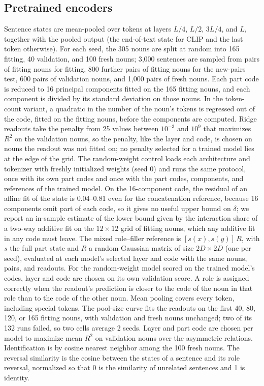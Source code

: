 \documentclass[10pt]{article}
\theoremstyle{plain}
\theoremstyle{remark}
\begin{document}
\subsection{Pretrained encoders}
Sentence states are mean-pooled over tokens at layers $L/4$, $L/2$, $3L/4$, and $L$, together with the pooled output (the end-of-text state for CLIP and the last token otherwise). For each seed, the 305 nouns are split at random into 165 fitting, 40 validation, and 100 fresh nouns; 3{,}000 sentences are sampled from pairs of fitting nouns for fitting, 800 further pairs of fitting nouns for the new-pairs test, 600 pairs of validation nouns, and 1{,}000 pairs of fresh nouns. Each part code is reduced to 16 principal components fitted on the 165 fitting nouns, and each component is divided by its standard deviation on those nouns. In the token-count variant, a quadratic in the number of the noun's tokens is regressed out of the code, fitted on the fitting nouns, before the components are computed. Ridge readouts take the penalty from 25 values between $10^{-3}$ and $10^{9}$ that maximizes $R^2$ on the validation nouns, so the penalty, like the layer and code, is chosen on nouns the readout was not fitted on; no penalty selected for a trained model lies at the edge of the grid. The random-weight control loads each architecture and tokenizer with freshly initialized weights (seed 0) and runs the same protocol, once with its own part codes and once with the part codes, components, and references of the trained model. On the 16-component code, the residual of an affine fit of the state is 0.04--0.81 even for the concatenation reference, because 16 components omit part of each code, so it gives no useful upper bound on $\delta$; we report an in-sample estimate of the lower bound given by the interaction share of a two-way additive fit on the $12 \times 12$ grid of fitting nouns, which any additive fit in any code must leave. The mixed role--filler reference is $[s(x), s(y)]\,R$, with $s$ the full part state and $R$ a random Gaussian matrix of size $2D \times 2D$ (one per seed), evaluated at each model's selected layer and code with the same nouns, pairs, and readouts. For the random-weight model scored on the trained model's codes, layer and code are chosen on its own validation score. A role is assigned correctly when the readout's prediction is closer to the code of the noun in that role than to the code of the other noun. Mean pooling covers every token, including special tokens. The pool-size curve fits the readouts on the first 40, 80, 120, or 165 fitting nouns, with validation and fresh nouns unchanged; two of its 132 runs failed, so two cells average 2 seeds. Layer and part code are chosen per model to maximize mean $R^2$ on validation nouns over the asymmetric relations. Identification is by cosine nearest neighbor among the 100 fresh nouns. The reversal similarity is the cosine between the states of a sentence and its role reversal, normalized so that 0 is the similarity of unrelated sentences and 1 is identity.
\end{document}
